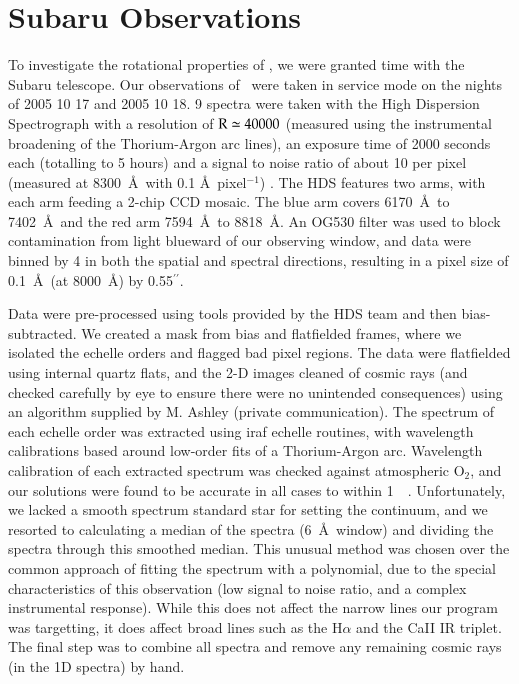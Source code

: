 \section{Subaru Observations}
To investigate the rotational properties of \starg, we were granted time
with the Subaru telescope. Our observations of \starg\ were taken in
service mode on the nights of 2005 10 17 and 2005 10 18. 9
spectra were taken with the High Dispersion Spectrograph
\citep[HDS, ][]{1998SPIE.3355..354N} with a resolution of $\rm{R}\simeq40000$ (measured using the instrumental broadening of the Thorium-Argon arc lines), an
exposure time of 2000 seconds each (totalling to 5 hours) and a signal to noise ratio of about 10 per pixel (measured at $8300$~\AA\ with 0.1 \AA~pixel$^{-1}$) . The HDS
features two arms, with each arm feeding a 2-chip CCD mosaic. The blue
arm covers 6170~\AA\ to 7402~\AA\ and the red arm 7594~\AA\ to
8818~\AA. An OG530 filter was used to block contamination from light
blueward of our observing window, and data were binned by 4 in both
the spatial and spectral directions, resulting in a pixel size of
0.1~\AA\ (at 8000~\AA) by 0.55$^{\prime\prime}$.

Data were pre-processed using tools provided by the HDS team and then
bias-subtracted. We created a mask from bias and flatfielded frames,
where we isolated the echelle orders and flagged bad pixel
regions. The data were flatfielded using internal quartz flats, and the
2-D images cleaned of cosmic rays (and checked carefully by eye to
ensure there were no unintended consequences) using an algorithm
supplied by M. Ashley (private communication). The spectrum of each
echelle order was extracted using \gls{iraf} echelle
routines, with wavelength calibrations based around low-order fits of
a Thorium-Argon arc. Wavelength calibration of each extracted spectrum
was checked against atmospheric O$_2$, and our solutions were found to
be accurate in all cases to within 1~\kms\
\citep{1985A&A...149..357C}. Unfortunately, we lacked a smooth
spectrum standard star for setting the continuum, and we resorted to
calculating a median of the spectra (6~\AA\ window) and dividing the
spectra through this smoothed median. This unusual method was chosen
over the common approach of fitting the spectrum with a polynomial,
due to the special characteristics of this observation (low signal to noise ratio, and a complex instrumental response). While this does not affect the narrow lines our program was
targetting, it does affect broad lines such as the H$\alpha$ and the
CaII IR triplet. The final step was to combine all spectra and remove
any remaining cosmic rays (in the 1D spectra) by hand.

